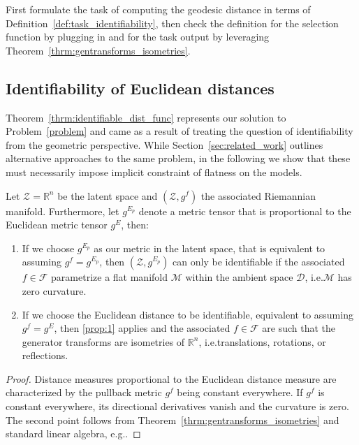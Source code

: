 \begin{proofsketch}
First formulate the task of computing the geodesic distance in terms of Definition~\ref{def:task_identifiability}, then check the definition for the selection function by plugging in and for the task output by leveraging Theorem~\ref{thrm:gentransforms_isometries}.
\end{proofsketch}

\subsection{Identifiability of Euclidean distances}

Theorem~\ref{thrm:identifiable_dist_func} represents our solution to Problem~\ref{problem} and came as a result of treating the question of identifiability from the geometric perspective. While Section~\ref{sec:related_work} outlines alternative approaches to the same problem, in the following we show that these must necessarily impose implicit constraint of flatness on the models.
%
\begin{proposition}
\label{prop:flat_models}
Let $\mathcal{Z}=\mathbb{R}^n$ be the latent space and $(\mathcal{Z},g^f)$ the associated Riemannian manifold. Furthermore, let $g^{E_p}$ denote a metric tensor that is proportional to the Euclidean metric tensor $g^E$, then:
\begin{enumerate}
[label=\textbf{P\arabic*},ref=P\arabic*]
    \item If we choose $g^{E_p}$ as our metric in the latent space, that is equivalent to assuming $g^f=g^{E_p}$, then $(\mathcal{Z}, g^{E_p})$ can only be identifiable if the associated $f\in \mathcal{F}$ parametrize a flat manifold $\mathcal{M}$ within the ambient space $\mathcal{D}$, i.e.\@ $\mathcal{M}$ has zero curvature.\label{prop:1}
    \item If we choose the Euclidean distance to be identifiable, equivalent to assuming $g^f=g^{E}$, then \ref{prop:1} applies and the associated $f\in \mathcal{F}$ are such that the generator transforms are isometries of $\mathbb{R}^n$, i.e.\@ translations, rotations, or reflections. \label{prop:2}
\end{enumerate}
\end{proposition}
\begin{proof}
   Distance measures proportional to the Euclidean distance measure are characterized by the pullback metric $g^f$ being constant everywhere. If $g^f$ is constant everywhere, its directional derivatives vanish and the curvature is zero. The second point follows from Theorem~\ref{thrm:gentransforms_isometries} and standard linear algebra, e.g.\@ \citet{friedberg2014linear}.
\end{proof}


